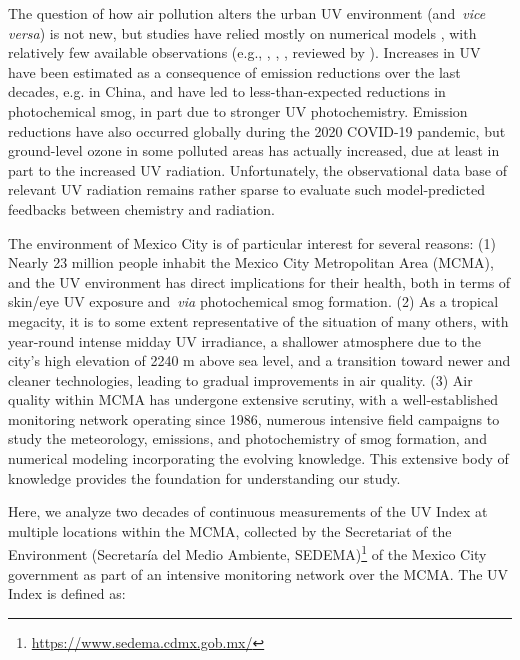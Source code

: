 \documentclass[journal=jacsat,manuscript=article]{achemso}
\begin{document}
The question of how air pollution alters the urban UV environment
(and~\emph{vice versa}) is not new, but studies have relied mostly on
numerical models \cite{Liu_1991,Sabziparvar_1998,Madronich_2011},
with relatively few available observations (e.g.,
\citet{McKenzie_2008}, \citet{Panicker_2009}, \citet{Palancar_2013},
reviewed by \citet{Bais_2015}). Increases in UV have been estimated as a consequence
of emission reductions over the last decades, e.g. in China,\citep{Hollaway_2019,Li_2018,Wang_2020}
and have led to less-than-expected
reductions in photochemical smog, in part due to stronger UV
photochemistry.\citep{Wang_2019,Gao_2020,Ma_2021}
Emission reductions have also occurred
globally during the 2020 COVID-19 pandemic,\citep{Bauwens_2020,Venter_2020}
but ground-level ozone in some polluted areas has actually
increased,\citep{Shi_2020,Le_2020} due at least in part to the increased UV
radiation. Unfortunately, the observational data base of relevant UV
radiation remains rather sparse to evaluate such model-predicted feedbacks between chemistry and radiation.~~

The environment of Mexico City is of particular interest for several
reasons: (1) Nearly 23 million people inhabit the Mexico City
Metropolitan Area (MCMA), and the UV environment has direct implications
for their health, both in terms of skin/eye UV exposure and~\emph{via}
photochemical smog formation. (2) As a tropical megacity, it is to some
extent representative of the situation of many others, with year-round
intense midday UV irradiance, a shallower atmosphere due to the city's
high elevation of 2240 m above sea level, and a transition toward newer
and cleaner technologies, leading to gradual improvements in air
quality. (3) Air quality within MCMA has undergone extensive scrutiny,
with a well-established monitoring network operating since
1986,\cite{RAMA}
numerous intensive field campaigns to study the
meteorology, emissions, and photochemistry of smog
formation,\citep{Doran_1998,Molina_2007,Molina_2010}
and numerical modeling incorporating the
evolving knowledge.\citep{Jazcilevich_2005,Tie_2007,Zhang_2009,Zavala_2020}
This extensive body of knowledge
provides the foundation for understanding our study.

Here, we analyze two decades of continuous measurements of the UV Index
at multiple locations within the MCMA, collected by the Secretariat of
the Environment (Secretaría del Medio Ambiente,
SEDEMA)\footnote{\url{https://www.sedema.cdmx.gob.mx/}} of the Mexico
City government as part of an intensive monitoring network over the
MCMA. The UV Index is defined as:
\end{document}
